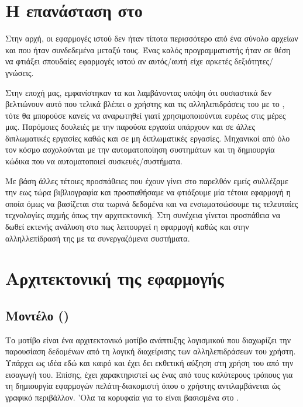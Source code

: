 \section{Η επανάσταση στο }

Στην αρχή, οι εφαρμογές ιστού δεν ήταν τίποτα περισσότερο από ένα σύνολο αρχείων  και
 που ήταν συνδεδεμένα μεταξύ τους. Ένας καλός προγραμματιστής ήταν σε θέση να φτιάξει σπουδαίες εφαρμογές ιστού αν αυτός/αυτή
είχε αρκετές δεξιότητες/γνώσεις.

Στην εποχή μας, εμφανίστηκαν τα  και λαμβάνοντας υπόψη ότι ουσιαστικά δεν βελτιώνουν αυτό που τελικά βλέπει ο χρήστης και τις
αλληλεπιδράσεις του με το , τότε
θα μπορούσε κανείς να αναρωτηθεί γιατί χρησιμοποιούνται ευρέως στις μέρες μας.
Παρόμοιες δουλειές με την παρούσα εργασία υπάρχουν και σε άλλες διπλωματικές εργασίες καθώς και σε μη διπλωματικές εργασίες. Μηχανικοί από όλο τον κόσμο
ασχολούνται με την αυτοματοποίηση συστημάτων και τη δημιουργία κώδικα που να αυτοματοποιεί συσκευές/συστήματα. 

Με βάση άλλες τέτοιες προσπάθειες που έχουν γίνει στο παρελθόν εμείς συλλέξαμε την εως τώρα βιβλιογραφία
και προσπαθήσαμε να φτιάξουμε μία τέτοια εφαρμογή η οποία όμως να βασίζεται στα τωρινά δεδομένα και να 
ενσωματσώσουμε τις τελευταίες τεχνολογίες αιχμής όπως την  αρχιτεκτονική. Στη συνέχεια γίνεται προσπάθεια να δωθεί εκτενής
ανάλυση στο πως λειτουργεί η εφαρμογή καθώς και στην αλληλλεπίδρασή της με τα συνεργαζόμενα συστήματα. 


\section{Αρχιτεκτονική της εφαρμογής}
 
\subsection{Μοντέλο  ()}

Το μοτίβο  είναι ένα αρχιτεκτονικό μοτίβο ανάπτυξης λογισμικού που διαχωρίζει την παρουσίαση δεδομένων από τη λογική διαχείρισης των αλληλεπιδράσεων του 
χρήστη. Υπάρχει ως ιδέα εδώ και καιρό και έχει δει εκθετική αύξηση στη χρήση του από την εισαγωγή του. 
Επίσης, έχει χαρακτηριστεί ως ένας από τους καλύτερους τρόπους για τη δημιουργία εφαρμογών πελάτη-διακομιστή όπου ο χρήστης αντιλαμβάνεται ώς γραφικό περιβάλλον. 'Ολα τα κορυφαία  
για το  είναι βασισμένα στο . 

